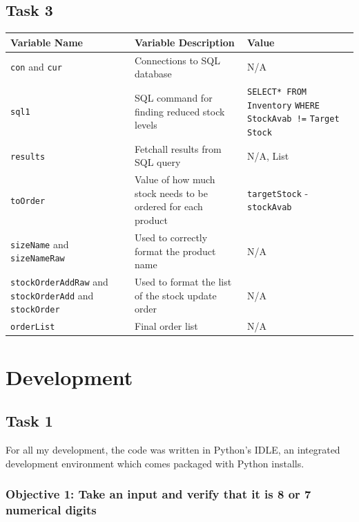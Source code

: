 \documentclass[a4paper]{article}
\begin{document}
\subsection{Task 3}
\begin{center}
\begin{tabular}{ | m{13em} | m{16em}| m{14em} | } 
  \hline
  Variable Name & Variable Description & Value \\ [0.5ex] 
  \hline\hline
  \verb|con| and \verb|cur| & Connections to SQL database & N/A \\
  \hline
  \verb|sql1| & SQL command for finding reduced stock levels & \verb|SELECT* FROM Inventory| \verb|WHERE StockAvab !=| \verb|Target Stock| \\
  \hline
  \verb|results| & Fetchall results from SQL query & N/A, List	\\
  \hline
  \verb|toOrder| & Value of how much stock needs to be ordered for each product & \verb|targetStock| - \verb|stockAvab| \\
  \hline
  \verb|sizeName| and \verb|sizeNameRaw| & Used to correctly format the product name & N/A \\
  \hline
  \verb|stockOrderAddRaw| and \verb|stockOrderAdd| and \verb|stockOrder| & Used to format the list of the stock update order & N/A \\
  \hline
  \verb|orderList| & Final order list & N/A \\
  \hline
  \end{tabular}
\end{center}


\section{Development}
\subsection{Task 1}
For all my development, the code was written in Python's IDLE, an integrated development environment which comes packaged with Python installs.
\subsubsection{Objective 1: Take an input and verify that it is 8 or 7 numerical digits}
\end{document}
